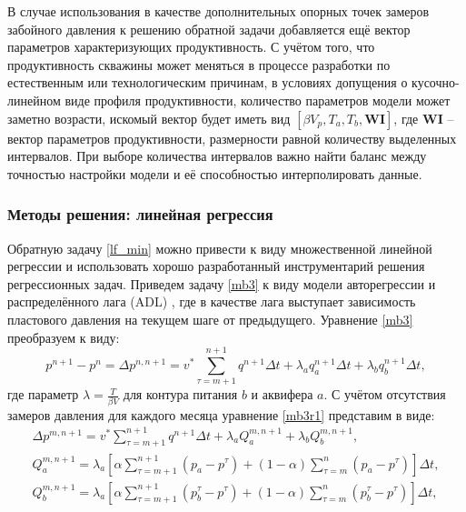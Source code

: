 \documentclass[14pt]{article}
\begin{document}
 В случае использования в качестве дополнительных опорных точек замеров забойного давления к решению обратной задачи добавляется ещё вектор параметров характеризующих продуктивность. С учётом того, что продуктивность скважины может меняться в процессе разработки по естественным или технологическим причинам, в условиях допущения о кусочно-линейном виде профиля продуктивности, количество параметров модели может заметно возрасти, искомый вектор будет иметь вид $[\beta V_p, T_a, T_b, \boldsymbol{WI}]$, где $\boldsymbol{WI}$ -- вектор параметров продуктивности, размерности равной количеству выделенных интервалов. При выборе количества интервалов важно найти баланс между точностью настройки модели и её способностью интерполировать данные.

\subsubsection{Методы решения: линейная регрессия} 
Обратную задачу \ref{lf_min} можно привести к виду множественной линейной регрессии и использовать хорошо разработанный инструментарий решения регрессионных задач. Приведем задачу \ref{mb3} к виду модели  авторегрессии и распределённого лага (ADL) \cite{econome3k}, где в качестве лага выступает зависимость пластового давления на текущем шаге от предыдущего.  
Уравнение \ref{mb3} преобразуем к виду:
\begin{equation}\label{mb3r1}
	p^{n+1} - p^n = \Delta p^{n,n+1} = v^*\sum_{\tau=m+1}^{n+1}q^{n+1}\Delta t + \lambda_a q_a^{n+1}\Delta t +	\lambda_b q_b^{n+1}\Delta t,
\end{equation}
где параметр $\lambda = \frac{T}{\beta V}$ для контура питания $b$ и аквифера $a$. С учётом отсутствия замеров давления для каждого месяца уравнение \ref{mb3r1} представим в виде:
\begin{equation}\label{mb3r2}
	\begin{aligned}
		\Delta p^{m,n+1} = v^* \sum_{\tau=m+1}^{n+1}q^{n+1}\Delta t + \lambda_a Q^{m,n+1}_a + \lambda_b Q^{m,n+1}_b,
		\\
		Q^{m,n+1}_a =  \lambda_a\left[\alpha\sum_{\tau=m+1}^{n+1} \left(p_a - p^{\tau}\right) + \left(1-\alpha\right)\sum_{\tau=m}^{n} \left(p_a - p^{\tau}\right)\right]\Delta t,
		\\
		Q^{m,n+1}_b =  \lambda_a\left[\alpha\sum_{\tau=m+1}^{n+1} \left(p_b^{\tau} - p^{\tau}\right) + \left(1-\alpha\right)\sum_{\tau=m}^{n} \left(p_b^{\tau} - p^{\tau}\right)\right]\Delta t,
	\end{aligned}
\end{equation}
\end{document}
